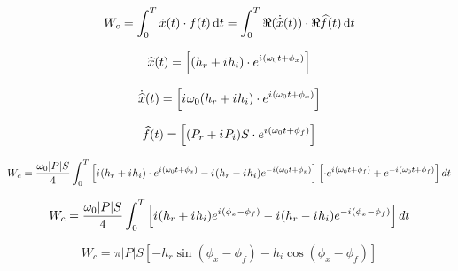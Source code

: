 
\newcommand{\iu}{{i\mkern1mu}}
\newcommand{\expx}{\cdot e^{\iu(\omega_0 t + \phi_x)}}
\newcommand{\expf}{\cdot e^{\iu(\omega_0 t + \phi_f)}}

\begin{equation}
    W_c = \int_0^T \dot{x} (t) \cdot f(t) \mathop{}\!\mathrm{d} t 
        = \int_0^T \Re (\dot{\widehat{x}} (t)) \cdot \Re{\widehat{f}(t)} \mathop{}\!\mathrm{d} t
\end{equation}

\begin{equation}
    \widehat{x}(t) = \left[(h_r + \iu h_i) \expx \right]
\end{equation}

\begin{equation}
    \dot{\widehat{x}}(t) = \left[\iu \omega_0 (h_r + \iu h_ i) \expx \right]
\end{equation}

\begin{equation}
    \widehat{f}(t) = \left[(P_r + \iu P_i) S \expf  \right]
\end{equation}

\begin{equation}
    W_c = \frac{\omega_0 |P| S}{4} 
            \int_0^T \left[
                \iu (h_r + \iu h_i) \expx - 
                \iu (h_r - \iu h_i)  e^{- \iu(\omega_0 t + \phi_x)} \right]
            \left[
                \expf + e^{- \iu(\omega_0 t + \phi_f)} 
            \right] dt
\end{equation}

\begin{equation}
    W_c = \frac{\omega_0 |P| S}{4} 
            \int_0^T 
            \left[
                \iu (h_r + \iu h_i) e^{\iu(\phi_x - \phi_f)}
                - \iu (h_r - \iu h_i) e^{- \iu(\phi_x - \phi_f)}
            \right] dt
\end{equation}

\begin{equation}
    W_c = \pi |P| S 
            \left[
                - h_r \sin(\phi_x - \phi_f)
                - h_i \cos(\phi_x - \phi_f)
            \right]
\end{equation}